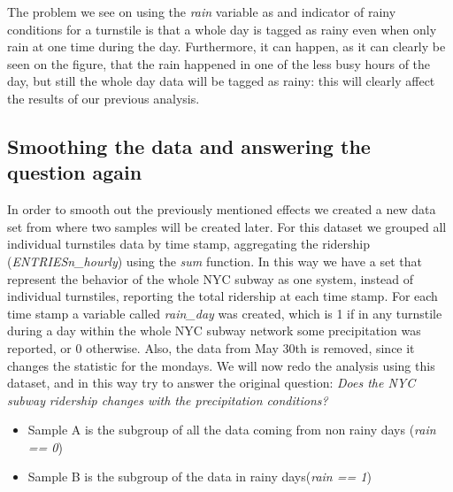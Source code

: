 \documentclass[letterpaper,10pt,english]{sphinxmanual}
\begin{document}
The problem we see on using the \emph{rain} variable as and indicator of rainy conditions
for a turnstile is that a whole day is tagged as rainy even when only rain at one
time during the day. Furthermore, it can happen, as it can clearly be seen on the figure,
that the rain happened in one of the less busy hours of the day, but still the whole
day data will be tagged as rainy: this will clearly affect the results of our
previous analysis.


\subsection{Smoothing the data and answering the question again}
\label{section1:smoothing-the-data-and-answering-the-question-again}
In order to smooth out the previously mentioned effects we created a new data
set from where two samples will be created later. For this dataset we grouped
all individual turnstiles data by time stamp, aggregating the ridership
(\emph{ENTRIESn\_hourly}) using the \emph{sum} function. In this way we have a set that
represent the behavior of the whole NYC subway as one system, instead of
individual turnstiles, reporting the total ridership at each time stamp. For each
time stamp a variable called \emph{rain\_day} was created, which is 1 if in any
turnstile during a day within the whole NYC subway network some precipitation
was reported, or 0 otherwise. Also, the data from May 30th is removed, since it
changes the statistic for the mondays. We will now redo the analysis using this
dataset, and in this way try to answer the original question: \emph{Does the NYC subway}
\emph{ridership changes with the precipitation conditions?}
\begin{itemize}
\item {} 
Sample A is the subgroup of all the data coming from non rainy days (\emph{rain == 0})

\item {} 
Sample B is the subgroup of the data in rainy days(\emph{rain == 1})

\end{itemize}
\end{document}
